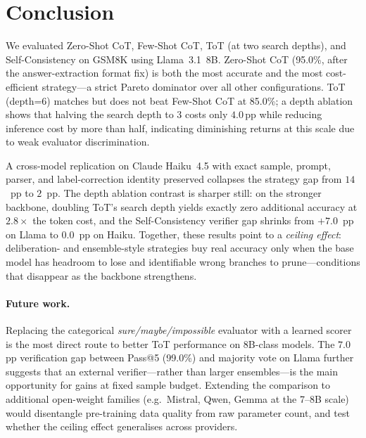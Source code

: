 ﻿\documentclass[runningheads]{llncs}
\begin{document}
\section{Conclusion}
\label{sec:conclusion}

We evaluated Zero-Shot CoT, Few-Shot CoT, ToT (at two search depths),
and Self-Consistency on GSM8K using Llama~3.1~8B.
Zero-Shot CoT (95.0\%, after the answer-extraction format fix) is both
the most accurate and the most cost-efficient strategy---a strict
Pareto dominator over all other configurations.
ToT (depth=6) matches but does not beat Few-Shot CoT at 85.0\%;
a depth ablation shows that halving the search depth to 3 costs only
$4.0$\,pp while reducing inference cost by more than half, indicating
diminishing returns at this scale due to weak evaluator discrimination.

A cross-model replication on Claude Haiku~4.5 with exact sample,
prompt, parser, and label-correction identity preserved collapses the
strategy gap from $14$~pp to $2$~pp.
The depth ablation contrast is sharper still: on the stronger
backbone, doubling ToT's search depth yields exactly zero additional
accuracy at $2.8\times$ the token cost, and the Self-Consistency
verifier gap shrinks from $+7.0$~pp on Llama to $0.0$~pp on Haiku.
Together, these results point to a \emph{ceiling effect}: deliberation-
and ensemble-style strategies buy real accuracy only when the base
model has headroom to lose and identifiable wrong branches to
prune---conditions that disappear as the backbone strengthens.

\paragraph{Future work.}
Replacing the categorical \textit{sure/maybe/impossible} evaluator
with a learned scorer is the most direct route to better ToT
performance on 8B-class models.
The $7.0$\,pp verification gap between Pass@5 (99.0\%) and majority
vote on Llama further suggests that an external verifier---rather
than larger ensembles---is the main opportunity for gains at fixed
sample budget.
Extending the comparison to additional open-weight families
(e.g.\ Mistral, Qwen, Gemma at the 7--8B scale) would disentangle
pre-training data quality from raw parameter count, and test whether
the ceiling effect generalises across providers.
\end{document}
